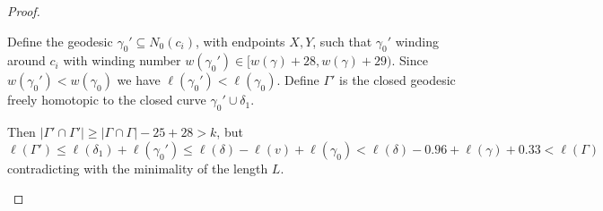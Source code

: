 \documentclass[11pt, a4paper]{article}
\theoremstyle{definition}
\theoremstyle{remark}
\newcommand{\bbh}{\mathbb{H}}
\newcommand{\calx}{\mathcal{X}}
\newcommand{\abs}[1]{\left| #1 \right|}
\newcommand{\bracket}[1]{\left( #1 \right)}
\begin{document}
\begin{proof}
\begin{enumerate}
Define the geodesic $\gamma_0'\subseteq N_0(c_i)$, with endpoints $X,Y$, such that $\gamma_0'$ winding around $c_i$ with winding number $w(\gamma_0')\in[w(\gamma)+28,w(\gamma)+29)$. Since $w(\gamma_0')<w(\gamma_0)$ we have $\ell(\gamma_0')<\ell(\gamma_0)$. Define $\Gamma'$ is the closed geodesic freely homotopic to the closed curve $\gamma_0'\cup\delta_1$.

 Then $\abs{\Gamma'\cap\Gamma'}\geqslant\abs{\Gamma\cap\Gamma}-25+28>k$, but
$$\ell(\Gamma')\leqslant\ell(\delta_1)+\ell(\gamma_0')\leqslant\ell(\delta)-\ell(v)+\ell(\gamma_0)<\ell(\delta)-0.96+\ell(\gamma)+0.33<\ell(\Gamma)$$
contradicting with the minimality of the length $L$.



\end{enumerate}

\end{proof}
\end{document}
